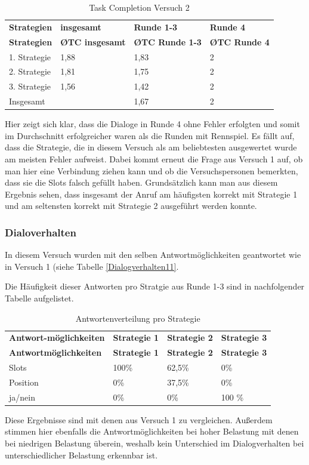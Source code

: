 \documentclass[12pt,a4paper]{scrartcl}
\begin{document}
\begin{longtable}{p{3cm}p{3cm}p{3cm}p{3cm} }
	\label{TCV2}\\
	\caption[Task Completion Versuch 2]{Task Completion Versuch 2}\\
	\hline
\textbf{Strategien}&\textbf{insgesamt}&\textbf{Runde 1-3} &\textbf{Runde 4}\\
	\hline
	\endfirsthead
	\hline
	\textbf{Strategien}&\textbf{\O TC insgesamt}&\textbf{\O TC Runde 1-3} &\textbf{\O TC Runde 4}\\
	\hline
	\endhead
1. Strategie & 1,88 & 1,83 & 2  \\
2. Strategie & 1,81 & 1,75 & 2  \\
3. Strategie & 1,56 & 1,42 & 2  \\
\hline
Insgesamt & & 1,67 & 2 \\ 
\hline
\end{longtable}

Hier zeigt sich klar, dass die Dialoge in Runde 4 ohne Fehler erfolgten und somit im Durchschnitt erfolgreicher waren als die Runden mit Rennspiel. Es fällt auf, dass die Strategie, die in diesem Versuch als am beliebtesten ausgewertet wurde am meisten Fehler aufweist. Dabei kommt erneut die Frage aus Versuch 1 auf, ob man hier eine Verbindung ziehen kann und ob die Versuchspersonen bemerkten, dass sie die Slots falsch gefüllt haben. 
Grundsätzlich kann man aus diesem Ergebnis sehen, dass insgesamt der Anruf am häufigsten korrekt mit Strategie 1 und am seltensten korrekt mit Strategie 2 ausgeführt werden konnte. 

\subsubsection{Dialoverhalten}
In diesem Versuch wurden mit den selben Antwortmöglichkeiten geantwortet wie in Versuch 1 (siehe Tabelle \ref{Dialogverhalten11}.

Die Häufigkeit dieser Antworten pro Stratgie aus Runde 1-3 sind in nachfolgender Tabelle aufgelistet.

\begin{longtable}{p{3cm}p{3cm}p{3cm}p{3cm} }
	\label{Dialogverhalten12}\\
	\caption[Antwortenverteilung pro Strategie]{Antwortenverteilung pro Strategie}\\
	\hline
\textbf{Antwort-möglichkeiten}&\textbf{Strategie 1}&\textbf{Strategie 2} &\textbf{Strategie 3}\\
	\hline
	\endfirsthead
	\hline
	\textbf{Antwortmöglichkeiten}&\textbf{Strategie 1}&\textbf{Strategie 2} &\textbf{Strategie 3}\\
	\hline
	\endhead
Slots & 100\% & 62,5\%\ & 0\%  \\
Position & 0\% & 37,5\% & 0\%  \\
ja/nein & 0\% & 0\%  & 100 \%  \\
\hline
\end{longtable}
Diese Ergebnisse sind mit denen aus Versuch 1 zu vergleichen. 
Außerdem stimmen hier ebenfalls die Antwortmöglichkeiten bei hoher Belastung mit denen bei niedrigen Belastung überein, weshalb kein Unterschied im Dialogverhalten bei unterschiedlicher Belastung erkennbar ist. 
\end{document}
